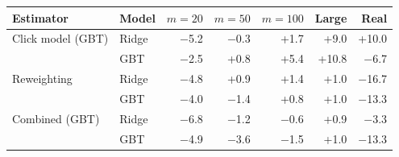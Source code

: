 \begin{tabular}{llrrrrr}
\toprule
Estimator & Model & $m{=}20$ & $m{=}50$ & $m{=}100$ & Large & Real\\
\midrule
Click model (GBT) & Ridge & $-$5.2 & $-$0.3 & +1.7 & +9.0 & +10.0\\
 & GBT & $-$2.5 & +0.8 & +5.4 & +10.8 & $-$6.7\\
Reweighting & Ridge & $-$4.8 & +0.9 & +1.4 & +1.0 & $-$16.7\\
 & GBT & $-$4.0 & $-$1.4 & +0.8 & +1.0 & $-$13.3\\
Combined (GBT) & Ridge & $-$6.8 & $-$1.2 & $-$0.6 & +0.9 & $-$3.3\\
 & GBT & $-$4.9 & $-$3.6 & $-$1.5 & +1.0 & $-$13.3\\
\bottomrule
\end{tabular}
